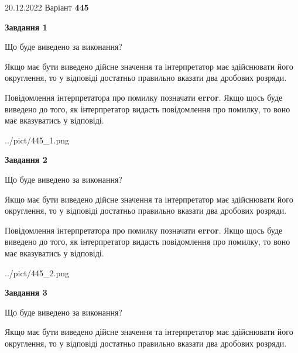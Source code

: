 \documentclass[12pt, ukrainian]{article}
\begin{document}
{20.12.2022 Варіант \No \textbf { 445 }\par}
{
\begin {Large}

{\begin {center}\textbf{Завдання 1}\end {center}}\par
Що буде виведено за виконання? \par

Якщо має бути виведено дійсне значення та інтерпретатор має здійснювати його округлення, 
то у відповіді достатньо правильно вказати два дробових розряди.

Повідомлення інтерпретатора про помилку позначати \textbf{error}.
Якщо щось буде виведено до того, як інтерпретатор видасть повідомлення про помилку, 
то воно має вказуватись у відповіді. \par

\begin{center}
	{../pict/445_1.png}
\end{center}
\newpage

{\begin {center}\textbf{Завдання 2}\end {center}}\par
Що буде виведено за виконання? \par

Якщо має бути виведено дійсне значення та інтерпретатор має здійснювати його округлення, 
то у відповіді достатньо правильно вказати два дробових розряди.

Повідомлення інтерпретатора про помилку позначати \textbf{error}.
Якщо щось буде виведено до того, як інтерпретатор видасть повідомлення про помилку, 
то воно має вказуватись у відповіді. \par

\begin{center}
	{../pict/445_2.png}
\end{center}
\newpage

{\begin {center}\textbf{Завдання 3}\end {center}}\par
Що буде виведено за виконання? \par

Якщо має бути виведено дійсне значення та інтерпретатор має здійснювати його округлення, 
то у відповіді достатньо правильно вказати два дробових розряди.


\end{Large}}
\end{document}
